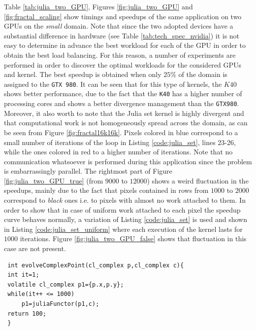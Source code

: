 Table \ref{tab:julia_two_GPU}, Figures \ref{fig:julia_two_GPU} and \ref{fig:fractal_scaling} show timings and speedups of the same application on two GPUs on the \textit{small} domain. Note that since the two adopted devices  have a substantial difference in hardware (see Table \ref{tab:tech_spec_nvidia}) it is not easy to determine in advance the best workload for each of the GPU in order to obtain the best load balancing. For this reason, a number of experiments are performed in order to discover the optimal workloads for the considered GPUs and kernel.
The best speedup is obtained when only $25\%$ of the domain is assigned to the \texttt{GTX 980}.
It can be seen that for this type of kernels, the $K40$ shows better performance, due to the fact that the \texttt{K40} has a higher number of processing cores and shows a better divergence management than the \texttt{GTX980}.
Moreover, it also worth to note that the Julia set kernel is highly divergent and that computational work is not homogeneously spread across the domain, as can be seen from Figure \ref{fig:fractal16k16k}. Pixels colored in blue correspond to a small number of iterations of the loop in Listing \ref{code:julia_set}, lines 23-26, while the ones colored in red to a higher number of iterations.
Note that no communication whatsoever is performed during this application since the problem is embarrassingly parallel.
The rightmost part of Figure \ref{fig:julia_two_GPU_true} (from $9000$ to $12000$) shows a weird fluctuation in the speedups, mainly due to the fact that pixels contained in rows from $1000$ to $2000$ correspond to \textit{black} ones i.e. to pixels with almost no work attached to them.
In order to show that in case of uniform work attached to each pixel the speedup curve behaves normally, a variation of Listing \ref{code:julia_set} is used and shown in Listing \ref{code:julia_set_uniform} where each execution of the kernel lasts for $1000$ iterations.
Figure \ref{fig:julia_two_GPU_false} shows that fluctuation in this case are not present.
\begin{minipage}{\linewidth}
 \begin{lstlisting}
 int evolveComplexPoint(cl_complex p,cl_complex c){
 int it=1;
 volatile cl_complex p1={p.x,p.y};
 while(it++ <= 1000)
     p1=juliaFunctor(p1,c);
 return 100;
 }
 \end{lstlisting}
\end{minipage}
 
